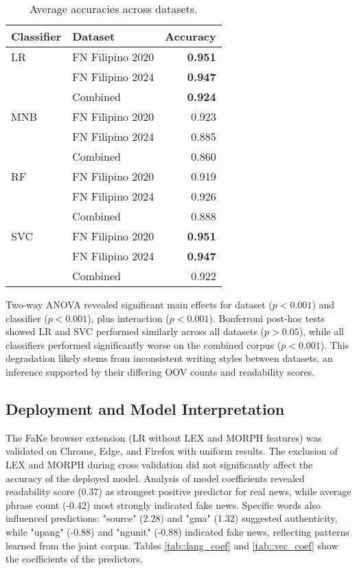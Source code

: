 \documentclass[conference]{IEEEtran}
\begin{document}
\begin{table}[!t]
\centering
\caption{Average accuracies across datasets.}
\label{tab:average_accuracies}
\begin{tabular}{llr}
\hline
\textbf{Classifier} & \textbf{Dataset} & \textbf{Accuracy} \\
\hline
LR & FN Filipino 2020 & \textbf{0.951} \\
 & FN Filipino 2024 & \textbf{0.947} \\
 & Combined & \textbf{0.924} \\
\hline
MNB & FN Filipino 2020 & 0.923 \\
 & FN Filipino 2024 & 0.885 \\
 & Combined & 0.860 \\
\hline
RF & FN Filipino 2020 & 0.919 \\
 & FN Filipino 2024 & 0.926 \\
 & Combined & 0.888 \\
\hline
SVC & FN Filipino 2020 & \textbf{0.951} \\
 & FN Filipino 2024 & \textbf{0.947} \\
 & Combined & 0.922 \\
\hline
\end{tabular}
\end{table}

Two-way ANOVA revealed significant main effects for dataset ($p<0.001$) and classifier ($p<0.001$), plus interaction ($p<0.001$). Bonferroni post-hoc tests showed LR and SVC performed similarly across all datasets ($p>0.05$), while all classifiers performed significantly worse on the combined corpus ($p<0.001$). This degradation likely stems from inconsistent writing styles between datasets, an inference supported by their differing OOV counts and readability scores.

\subsection{Deployment and Model Interpretation}
The FaKe browser extension (LR without LEX and MORPH features) was validated on Chrome, Edge, and Firefox with uniform results.  The exclusion of LEX and MORPH during cross validation did not significantly affect the accuracy of the deployed model. Analysis of model coefficients revealed readability score (0.37) as strongest positive predictor for real news, while average phrase count (-0.42) most strongly indicated fake news. Specific words also influenced predictions: "source" (2.28) and "gma" (1.32) suggested authenticity, while "upang" (-0.88) and "ngunit" (-0.88) indicated fake news, reflecting patterns learned from the joint corpus. Tables \ref{tab::lang_coef} and \ref{tab::vec_coef} show the coefficients of the predictors.
\end{document}
